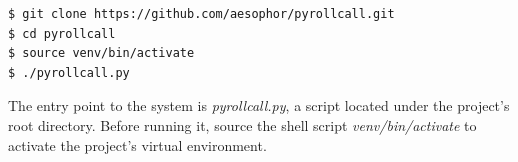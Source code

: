 

\begin{lstlisting}[numbers=none,xleftmargin=0em,caption={Shell commands to checkout and run PyRollCall}]
$ git clone https://github.com/aesophor/pyrollcall.git
$ cd pyrollcall
$ source venv/bin/activate
$ ./pyrollcall.py 
\end{lstlisting}

The entry point to the system is \emph{pyrollcall.py}, a script located under the project's root directory.
Before running it, source the shell script \emph{venv/bin/activate} to activate the project's virtual environment.
\clearpage

